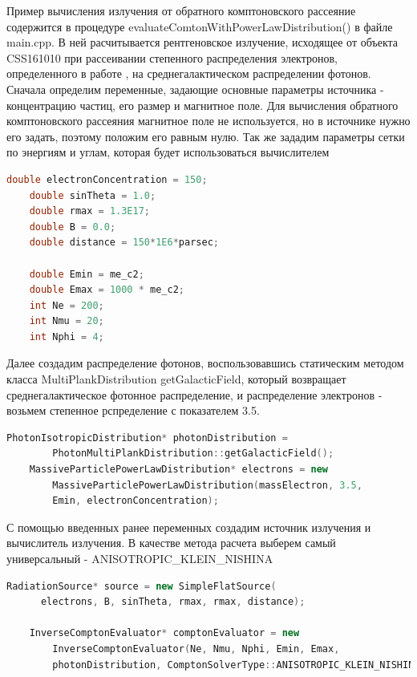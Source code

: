 Пример вычисления излучения от обратного комптоновского рассеяние содержится в процедуре evaluateComtonWithPowerLawDistribution() в файле main.cpp. В ней расчитывается рентгеновское излучение, исходящее от объекта CSS161010 при рассеивании степенного распределения электронов, определенного в работе \cite{Coppejans2020}, на среднегалактическом распределении фотонов.  Сначала определим переменные, задающие основные параметры источника - концентрацию частиц, его размер и магнитное поле. Для вычисления обратного комптоновского рассеяния магнитное поле не используется, но в источнике нужно его задать, поэтому положим его равным нулю. Так же зададим параметры сетки по энергиям и углам, которая будет использоваться вычислителем

\begin{lstlisting}[language=c++]
	double electronConcentration = 150;
	double sinTheta = 1.0;
	double rmax = 1.3E17;
	double B = 0.0;
	double distance = 150*1E6*parsec;
	
	double Emin = me_c2;
	double Emax = 1000 * me_c2;
	int Ne = 200;
	int Nmu = 20;
	int Nphi = 4;
\end{lstlisting}

Далее создадим распределение фотонов, воспользовавшись статическим методом класса MultiPlankDistribution getGalacticField, который возвращает среднегалактическое фотонное распределение, и распределение электронов - возьмем степенное рспределение с показателем 3.5.
\begin{lstlisting}[language=c++]
	PhotonIsotropicDistribution* photonDistribution = 
	    PhotonMultiPlankDistribution::getGalacticField();
	MassiveParticlePowerLawDistribution* electrons = new 
	    MassiveParticlePowerLawDistribution(massElectron, 3.5,
	    Emin, electronConcentration);
\end{lstlisting}

С помощью введенных ранее переменных создадим источник излучения и вычислитель излучения. В качестве метода расчета выберем самый универсальный - ANISOTROPIC\_KLEIN\_NISHINA

\begin{lstlisting}[language=c++]
	RadiationSource* source = new SimpleFlatSource(
	  electrons, B, sinTheta, rmax, rmax, distance);
	
	InverseComptonEvaluator* comptonEvaluator = new 
	    InverseComptonEvaluator(Ne, Nmu, Nphi, Emin, Emax, 
	    photonDistribution, ComptonSolverType::ANISOTROPIC_KLEIN_NISHINA);
\end{lstlisting}


